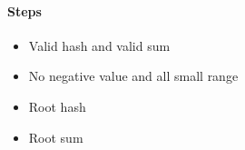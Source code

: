 \paragraph{Steps}
\begin{itemize}
   \item Valid hash and valid sum
   \item No negative value and all small range
   \item Root hash
   \item Root sum
   \end{itemize}


